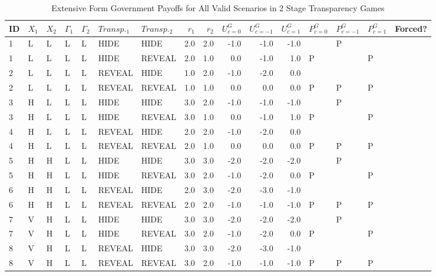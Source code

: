 \begingroup\tiny
\begin{longtable}{lllllllrrrrrllll}
\caption{Extensive Form Government Payoffs for All Valid Scenarios in 2 Stage Transparency Games} \\ 
  \hline
ID & $X_{1}$ & $X_{2}$ & $\Gamma_{1}$ & $\Gamma_{2}$ & $Transp._{1}$ & $Transp._{2}$ & $r_{1}$ & $r_{2}$ & $U^{G}_{c = 0}$ & $U^{G}_{c = -1}$ & $U^{G}_{c = 1}$ & $P^{G}_{c=0}$ & $P^{G}_{c = -1}$ & $P^{G}_{c = 1}$ & Forced? \\ 
  \hline
1 & L & L & L & L & HIDE & HIDE & 2.0 & 2.0 & -1.0 & -1.0 & -1.0 &  & P &  &  \\ 
  1 & L & L & L & L & HIDE & REVEAL & 2.0 & 1.0 & 0.0 & -1.0 & 1.0 & P &  & P &  \\ 
  2 & L & L & L & L & REVEAL & HIDE & 1.0 & 2.0 & -1.0 & -2.0 & 0.0 &  &  &  &  \\ 
  2 & L & L & L & L & REVEAL & REVEAL & 1.0 & 1.0 & 0.0 & 0.0 & 0.0 & P & P & P &  \\ 
  3 & H & L & L & L & HIDE & HIDE & 3.0 & 2.0 & -1.0 & -1.0 & -1.0 &  & P &  &  \\ 
  3 & H & L & L & L & HIDE & REVEAL & 3.0 & 1.0 & 0.0 & -1.0 & 1.0 & P &  & P &  \\ 
  4 & H & L & L & L & REVEAL & HIDE & 2.0 & 2.0 & -1.0 & -2.0 & 0.0 &  &  &  &  \\ 
  4 & H & L & L & L & REVEAL & REVEAL & 2.0 & 1.0 & 0.0 & 0.0 & 0.0 & P & P & P &  \\ 
  5 & H & H & L & L & HIDE & HIDE & 3.0 & 3.0 & -2.0 & -2.0 & -2.0 &  & P &  &  \\ 
  5 & H & H & L & L & HIDE & REVEAL & 3.0 & 2.0 & -1.0 & -2.0 & 0.0 & P &  & P &  \\ 
  6 & H & H & L & L & REVEAL & HIDE & 2.0 & 3.0 & -2.0 & -3.0 & -1.0 &  &  &  &  \\ 
  6 & H & H & L & L & REVEAL & REVEAL & 2.0 & 2.0 & -1.0 & -1.0 & -1.0 & P & P & P &  \\ 
  7 & V & H & L & L & HIDE & HIDE & 3.0 & 3.0 & -2.0 & -2.0 & -2.0 &  & P &  &  \\ 
  7 & V & H & L & L & HIDE & REVEAL & 3.0 & 2.0 & -1.0 & -2.0 & 0.0 & P &  & P &  \\ 
  8 & V & H & L & L & REVEAL & HIDE & 3.0 & 3.0 & -2.0 & -3.0 & -1.0 &  &  &  &  \\ 
  8 & V & H & L & L & REVEAL & REVEAL & 3.0 & 2.0 & -1.0 & -1.0 & -1.0 & P & P & P &  \\ 

\end{longtable}
